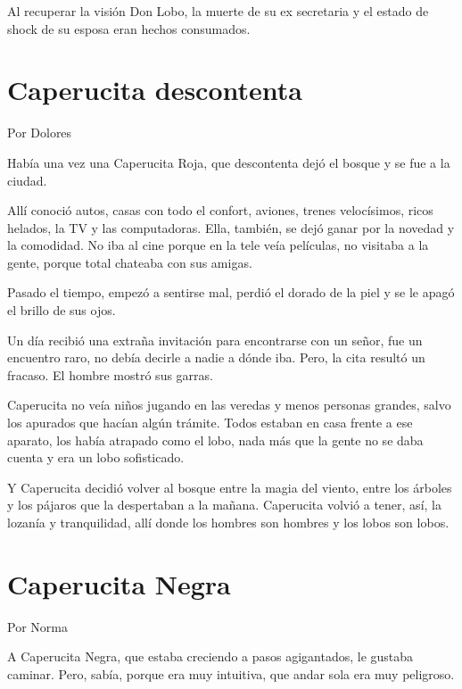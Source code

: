 \documentclass[11pt,twoside,openright,a5paper]{book}
\begin{document}
Al recuperar la visión Don Lobo, la muerte de su ex secretaria y el estado de shock de su esposa eran hechos consumados.

\section*{Caperucita descontenta}

\begin{flushright}Por Dolores\end{flushright}

Había una vez una Caperucita Roja, que descontenta dejó el bosque y se fue a la ciudad.

Allí conoció autos, casas con todo el confort, aviones, trenes velocísimos, ricos helados, la TV y las computadoras. Ella, también, se dejó ganar por la novedad y la comodidad. No iba al cine porque en la tele veía películas, no visitaba a la gente, porque total chateaba con sus amigas.

Pasado el tiempo, empezó a sentirse mal, perdió el dorado de la piel y se le apagó el brillo de sus ojos.

Un día recibió una extraña invitación para encontrarse con un señor, fue un encuentro raro, no debía decirle a nadie a dónde iba. Pero, la cita resultó un fracaso. El hombre mostró sus garras.

Caperucita no veía niños jugando en las veredas y menos personas grandes, salvo los apurados que hacían algún trámite. Todos estaban en casa frente a ese aparato, los había atrapado como el lobo, nada más que la gente no se daba cuenta y era un lobo sofisticado. 

Y Caperucita decidió volver al bosque entre la magia del viento, entre los árboles y los pájaros que la despertaban a la mañana. Caperucita volvió a tener, así, la lozanía y tranquilidad, allí donde los hombres son hombres y los lobos son lobos.

\section*{Caperucita Negra}

\begin{flushright}Por Norma\end{flushright}

A Caperucita Negra, que estaba creciendo a pasos agigantados, le gustaba caminar. Pero, sabía, porque era muy intuitiva, que andar sola era muy peligroso.
\end{document}
